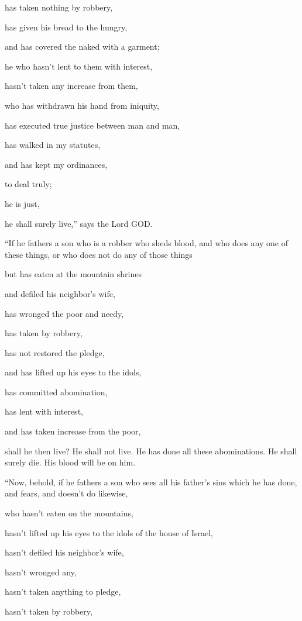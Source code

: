 has taken nothing by robbery,

has given his bread to the hungry,

and has covered the naked with a garment;

\myverse{}he who hasn’t lent to them with interest,

hasn’t taken any increase from them,

who has withdrawn his hand from iniquity,

has executed true justice between man and man,

\myverse{}has walked in my statutes,

and has kept my ordinances,

to deal truly;

he is just,

he shall surely live,” says the Lord GOD.


\vspace{\baselineskip} \myverse{}“If he fathers a son who is a robber who sheds blood, and who
does any one of these things,
\myverse{}or who does not do any of those things

but has eaten at the mountain shrines

and defiled his neighbor’s wife,

\myverse{}has wronged the poor and needy,

has taken by robbery,

has not restored the pledge,

and has lifted up his eyes to the idols,

has committed abomination,

\myverse{}has lent with interest,

and has taken increase from the poor,

shall he then live? He shall not live. He has done all these abominations. He shall
surely die. His blood will be on him.

\myverse{}“Now, behold, if he fathers a son who sees all his father’s
sins which he has done, and fears, and doesn’t do likewise,

\myverse{}who hasn’t eaten on the mountains,

hasn’t lifted up his eyes to the idols of the house of Israel,

hasn’t defiled his neighbor’s wife,

\myverse{}hasn’t wronged any,

hasn’t taken anything to pledge,

hasn’t taken by robbery,

